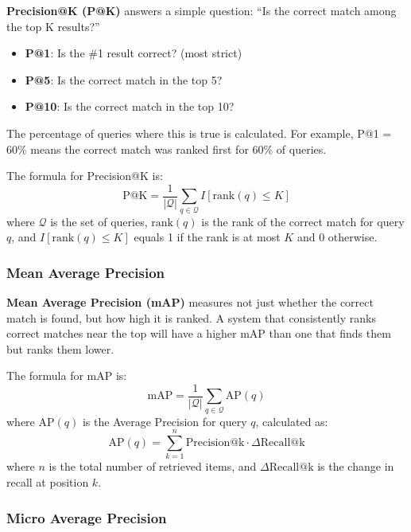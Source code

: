 \documentclass[
    english,
]{VUMIFPSbakalaurinis}
\begin{document}
\textbf{Precision@K (P@K)} answers a simple question: \enquote{Is the correct match among the top K results?}

\begin{itemize}
    \item \textbf{P@1}: Is the \#1 result correct? (most strict)
    \item \textbf{P@5}: Is the correct match in the top 5?
    \item \textbf{P@10}: Is the correct match in the top 10?
\end{itemize}

The percentage of queries where this is true is calculated. For example, P@1 = 60\% means the correct match was ranked first for 60\% of queries.

The formula for Precision@K is:
\begin{equation}
\text{P@K} = \frac{1}{|\mathcal{Q}|} \sum_{q \in \mathcal{Q}} I[\text{rank}(q) \leq K]
\label{eq:patk}
\end{equation}
where $\mathcal{Q}$ is the set of queries, $\text{rank}(q)$ is the rank of the correct match for query $q$, and $I[\text{rank}(q) \leq K]$ equals 1 if the rank is at most $K$ and 0 otherwise.

\subsubsection{Mean Average Precision}

\textbf{Mean Average Precision (mAP)} measures not just whether the correct match is found, but how high it is ranked. A system that consistently ranks correct matches near the top will have a higher mAP than one that finds them but ranks them lower.

The formula for mAP is:
\begin{equation}
\text{mAP} = \frac{1}{|\mathcal{Q}|} \sum_{q \in \mathcal{Q}} \text{AP}(q)
\label{eq:map}
\end{equation}
where $\text{AP}(q)$ is the Average Precision for query $q$, calculated as:
\begin{equation}
\text{AP}(q) = \sum_{k=1}^{n} \text{Precision@k} \cdot \Delta\text{Recall@k}
\label{eq:ap}
\end{equation}
where $n$ is the total number of retrieved items, and $\Delta\text{Recall@k}$ is the change in recall at position $k$.

\subsubsection{Micro Average Precision}
\end{document}
